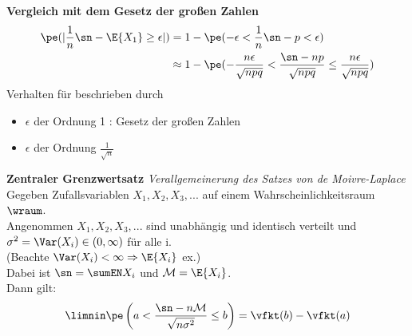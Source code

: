 
\begin{beo}
    \textbf{Vergleich mit dem Gesetz der großen Zahlen} 
    \begin{align*}
        \pe(|\frac{1}{n} \sn - \E{X_1} \geq \epsilon|) & = 1 - \pe (- \epsilon < \frac{1}{n} \sn - p < \epsilon) \\
        & \approx 1 - \pe (- \frac{n \epsilon}{\sqrt{npq}} <  \frac{\sn - np}{\sqrt{npq}} \leq \frac{n \epsilon}{
            \sqrt{npq}})
    \end{align*}
    Verhalten für beschrieben durch
    \begin{itemize}
        \item $\epsilon$ der Ordnung 1 : Gesetz der großen Zahlen
        \item $\epsilon$ der Ordnung $\frac{1}{\sqrt{n}}$ \txc{()}
    \end{itemize}
\end{beo}



\begin{satz}
    \textbf{Zentraler Grenzwertsatz} \textit{Verallgemeinerung des Satzes von de Moivre-Laplace}   \\
    Gegeben Zufallsvariablen $X_1, X_2, X_3, ...$ auf einem Wahrscheinlichkeitsraum $\wraum$. \\
    Angenommen $X_1, X_2, X_3, ...$ sind unabhängig und identisch verteilt und $\sigma^2 = \Var(X_i) \in (0, \infty)$ für alle i. \\
    (Beachte $ \Var(X_i)  < \infty \Rightarrow \E{X_i}$ ex.) \\
    Dabei ist $\sn = \sumEN X_i$ und $\mathcal{M} = \E{X_i}$. \\
    Dann gilt:
    \[
        \limnin \pe \left(  a < \frac{\sn - n \mathcal{M}}{\sqrt{n \sigma^2}} \leq b \right) = \vfkt(b) - \vfkt(a)
    \]
\end{satz}

